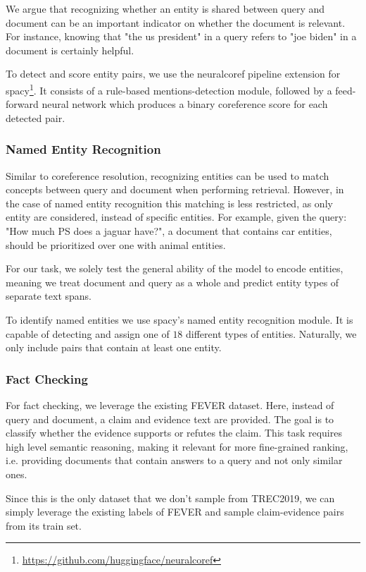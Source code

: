 We argue that recognizing whether an entity is shared between query and document can be an important indicator on whether the document is relevant. For instance, knowing that "the us president" in a query refers to "joe biden" in a document is certainly helpful.

To detect and score entity pairs, we use the neuralcoref pipeline extension for spacy\footnote{\url{https://github.com/huggingface/neuralcoref}}. It consists of a rule-based mentions-detection module, followed by a feed-forward neural network which produces a binary coreference score for each detected pair.

\subsubsection{Named Entity Recognition}
Similar to coreference resolution, recognizing entities can be used to match concepts between query and document when performing retrieval. However, in the case of named entity recognition this matching is less restricted, as only entity  are considered, instead of specific entities. For example, given the query: "How much PS does a jaguar have?", a document that contains car entities, should be prioritized over one with animal entities.

For our task, we solely test the general ability of the model to encode entities, meaning we treat document and query as a whole and predict entity types of separate text spans.

To identify named entities we use spacy's \cite{spacy2} named entity recognition module. It is capable of detecting and assign one of $18$ different types of entities. Naturally, we only include pairs that contain at least one entity.

\subsubsection{Fact Checking}
For fact checking, we leverage the existing FEVER \cite{thorne-etal-2018-fever} dataset. Here, instead of query and document, a claim and evidence text are provided. The goal is to classify whether the evidence supports or refutes the claim. This task requires high level semantic reasoning, making it relevant for more fine-grained ranking, i.e. providing documents that contain  answers to a query and not only similar ones.

Since this is the only dataset that we don't sample from TREC2019, we can simply leverage the existing labels of FEVER and sample claim-evidence pairs from its train set.

